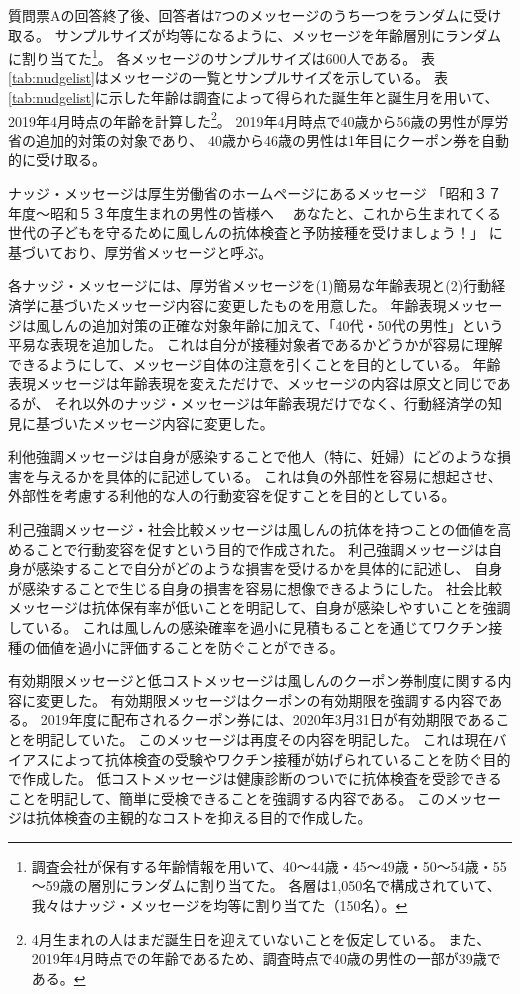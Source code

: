 \documentclass[
  11pt,
  a4paper,
]{article}
\begin{document}
質問票Aの回答終了後、回答者は7つのメッセージのうち一つをランダムに受け取る。
サンプルサイズが均等になるように、メッセージを年齢層別にランダムに割り当てた\footnote{調査会社が保有する年齢情報を用いて、40～44歳・45～49歳・50～54歳・55～59歳の層別にランダムに割り当てた。
  各層は1,050名で構成されていて、我々はナッジ・メッセージを均等に割り当てた（150名）。}。
各メッセージのサンプルサイズは600人である。
表\ref{tab:nudgelist}はメッセージの一覧とサンプルサイズを示している。
表\ref{tab:nudgelist}に示した年齢は調査によって得られた誕生年と誕生月を用いて、2019年4月時点の年齢を計算した\footnote{4月生まれの人はまだ誕生日を迎えていないことを仮定している。
  また、2019年4月時点での年齢であるため、調査時点で40歳の男性の一部が39歳である。}。
2019年4月時点で40歳から56歳の男性が厚労省の追加的対策の対象であり、
40歳から46歳の男性は1年目にクーポン券を自動的に受け取る。

ナッジ・メッセージは厚生労働省のホームページにあるメッセージ
「昭和３７年度～昭和５３年度生まれの男性の皆様へ　
あなたと、これから生まれてくる世代の子どもを守るために風しんの抗体検査と予防接種を受けましょう！」
に基づいており、厚労省メッセージと呼ぶ。

各ナッジ・メッセージには、厚労省メッセージを(1)簡易な年齢表現と(2)行動経済学に基づいたメッセージ内容に変更したものを用意した。
年齢表現メッセージは風しんの追加対策の正確な対象年齢に加えて、「40代・50代の男性」という平易な表現を追加した。
これは自分が接種対象者であるかどうかが容易に理解できるようにして、メッセージ自体の注意を引くことを目的としている。
年齢表現メッセージは年齢表現を変えただけで、メッセージの内容は原文と同じであるが、
それ以外のナッジ・メッセージは年齢表現だけでなく、行動経済学の知見に基づいたメッセージ内容に変更した。

利他強調メッセージは自身が感染することで他人（特に、妊婦）にどのような損害を与えるかを具体的に記述している。
これは負の外部性を容易に想起させ、外部性を考慮する利他的な人の行動変容を促すことを目的としている。

利己強調メッセージ・社会比較メッセージは風しんの抗体を持つことの価値を高めることで行動変容を促すという目的で作成された。
利己強調メッセージは自身が感染することで自分がどのような損害を受けるかを具体的に記述し、
自身が感染することで生じる自身の損害を容易に想像できるようにした。
社会比較メッセージは抗体保有率が低いことを明記して、自身が感染しやすいことを強調している。
これは風しんの感染確率を過小に見積もることを通じてワクチン接種の価値を過小に評価することを防ぐことができる。

有効期限メッセージと低コストメッセージは風しんのクーポン券制度に関する内容に変更した。
有効期限メッセージはクーポンの有効期限を強調する内容である。
2019年度に配布されるクーポン券には、2020年3月31日が有効期限であることを明記していた。
このメッセージは再度その内容を明記した。
これは現在バイアスによって抗体検査の受験やワクチン接種が妨げられていることを防ぐ目的で作成した。
低コストメッセージは健康診断のついでに抗体検査を受診できることを明記して、簡単に受検できることを強調する内容である。
このメッセージは抗体検査の主観的なコストを抑える目的で作成した。
\end{document}
